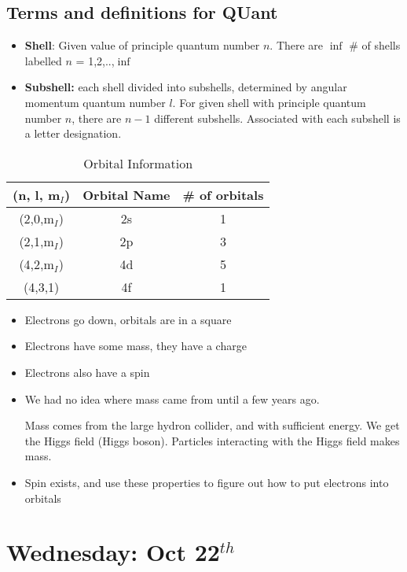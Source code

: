 \documentclass{article}
\begin{document}
\subsection{Terms and definitions for QUant}
\begin{itemize}
  \item \textbf{Shell}: Given value of principle quantum number $n$. There are $\inf{} $ \# of shells labelled $n$ = 1,2,..,$\inf{}$
  \item \textbf{Subshell:} each shell divided into subshells, determined by angular momentum quantum number $l$.
    For given shell with principle quantum number $n$, there are $n-1$ different subshells.
    Associated with each subshell is a letter designation.
\end{itemize}

\begin{table}[h]
    \centering
    \begin{tabular}{ccc}
        \textbf{(n, l, m$_I$)} & \textbf{Orbital Name} & \textbf{\# of orbitals} \\
        \hline
        (2,0,m$_I$) & 2s & 1 \\
        (2,1,m$_I$) & 2p & 3 \\
        (4,2,m$_I$) & 4d & 5 \\
        (4,3,1) & 4f & 1 \\
    \end{tabular}
    \caption{Orbital Information}
\end{table}

\begin{itemize}
  \item Electrons go down, orbitals are in a square
  \item Electrons have some mass, they have a charge
  \item Electrons also have a spin
  \item We had no idea where mass came from until a few years ago.

    Mass comes from the large hydron collider, and with sufficient energy.
    We get the Higgs field (Higgs boson). Particles interacting with the Higgs field makes mass.
  \item Spin exists, and use these properties to figure out how to put electrons into orbitals
\end{itemize}

\newpage{}

\section{Wednesday: Oct 22$^{th}$}
\end{document}
